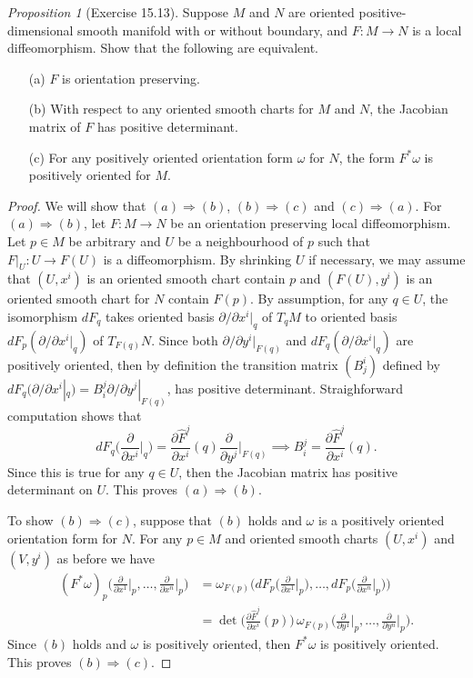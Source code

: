 \documentclass[a4paper]{article}
\theoremstyle{remark}
\newtheorem{prop}{Proposition}
\newcommand{\doo}{\partial}    %
\begin{document}
\begin{prop}[Exercise 15.13]
Suppose $M$ and $N$ are oriented positive-dimensional smooth manifold with or without boundary, and $F : M \to N$ is a local diffeomorphism. Show that the following are equivalent.
\begin{enumerate}[nolistsep]
\item[(a)] $F$ is orientation preserving.
\item[(b)] With respect to any oriented smooth charts for $M$ and $N$, the Jacobian matrix of $F$ has positive determinant.
\item[(c)] For any positively oriented orientation form $\omega$ for $N$, the form $F^*\omega$ is positively oriented for $M$.
\end{enumerate}
\end{prop}
\begin{proof}
We will show that $(a)\Rightarrow (b)$, $(b) \Rightarrow (c)$ and $(c) \Rightarrow (a)$. For $(a) \Rightarrow (b)$, let $F : M \to N$ be an orientation preserving local diffeomorphism. Let $p \in M$ be arbitrary and $U$ be a neighbourhood of $p$ such that $F|_{U} : U \to F(U)$ is a diffeomorphism. By shrinking $U$ if necessary, we may assume that $(U,x^i)$ is an oriented smooth chart contain $p$ and $(F(U),y^i)$ is an oriented smooth chart for $N$ contain $F(p)$. By assumption, for any $q \in U$, the isomorphism $dF_q$ takes oriented basis $\doo/\doo x^i|_q$ of $T_qM$ to oriented basis $dF_p(\doo/\doo x^i|_q)$ of $T_{F(q)}N$. Since both $\doo/\doo y^i|_{F(q)}$ and $dF_q(\doo/\doo x^i|_q)$ are positively oriented, then by definition the transition matrix $(B^i_j)$ defined by $dF_q(\doo/\doo x^i|_q) = B^j_i\doo/\doo y^j|_{F(q)} $, has positive determinant. Straighforward computation shows that
$$
dF_q\bigg( \frac{\doo}{\doo x^i}\bigg|_q \bigg) = \frac{\doo \widehat{F}^j}{\doo x^i}(q) \frac{\doo}{\doo y^j}\bigg|_{F(q)} \implies B_i^j = \frac{\doo \widehat{F}^j}{\doo x^i}(q). 
$$
Since this is true for any $q \in U$, then the Jacobian matrix has positive determinant on $U$. This proves $(a)\Rightarrow (b)$. 

To show $(b) \Rightarrow (c)$, suppose that $(b)$ holds and $\omega$ is a positively oriented orientation form for $N$. For any $p\in M$ and oriented smooth charts $(U,x^i)$ and $(V,y^i)$ as before we have 
\begin{align*}
(F^*\omega)_p\bigg( \frac{\doo}{\doo x^1}\bigg|_p,\dots,\frac{\doo}{\doo x^n}\bigg|_p \bigg) &= \omega_{F(p)} \bigg(dF_p\bigg(\frac{\doo}{\doo x^1}\bigg|_p\bigg), \dots, dF_p\bigg(\frac{\doo}{\doo x^n}\bigg|_p\bigg)\bigg) \\
&= \det \bigg(\frac{\doo \widehat{F}^j}{\doo x^i}(p) \bigg)\, \omega_{F(p)} \bigg( \frac{\doo}{\doo y^1}\bigg|_p,\dots,\frac{\doo}{\doo y^n}\bigg|_p \bigg).
\end{align*} 
Since $(b)$ holds and $\omega$ is positively oriented, then $F^*\omega$ is positively oriented. This proves $(b) \Rightarrow (c)$.


\end{proof}
\end{document}
